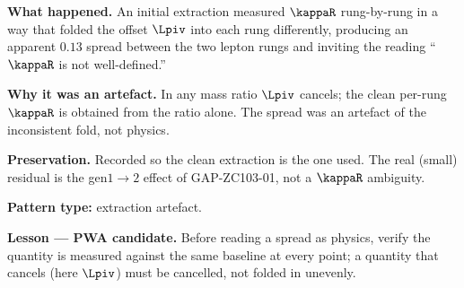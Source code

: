 \documentclass[12pt, a4paper]{article}
\begin{document}
\begin{derivedbox}[title={PM-ZC103-01: A per-rung $\kappaR$ folds in $\Lpiv$ and fakes a spread (Failure Stance)}]
\textbf{What happened.} An initial extraction measured $\kappaR$ rung-by-rung in
a way that folded the offset $\Lpiv$ into each rung differently, producing an
apparent $0.13$ spread between the two lepton rungs and inviting the reading
``$\kappaR$ is not well-defined.''

\textbf{Why it was an artefact.} In any mass ratio $\Lpiv$ cancels; the clean
per-rung $\kappaR$ is obtained from the ratio alone. The spread was an artefact
of the inconsistent fold, not physics.

\textbf{Preservation.} Recorded so the clean extraction is the one used. The
real (small) residual is the gen$1{\to}2$ effect of GAP-ZC103-01, not a
$\kappaR$ ambiguity.

\textbf{Pattern type:} extraction artefact.

\textbf{Lesson --- PWA candidate.} Before reading a spread as physics, verify the
quantity is measured against the same baseline at every point; a quantity that
cancels (here $\Lpiv$) must be cancelled, not folded in unevenly.
\end{derivedbox}
\end{document}
